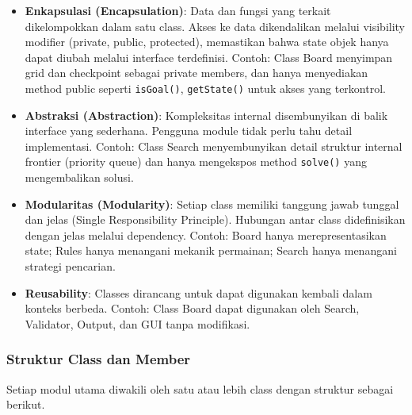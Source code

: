 \begin{itemize}
    \item \textbf{Enkapsulasi (Encapsulation)}: Data dan fungsi yang terkait dikelompokkan dalam satu class. Akses ke data dikendalikan melalui visibility modifier (private, public, protected), memastikan bahwa state objek hanya dapat diubah melalui interface terdefinisi. Contoh: Class Board menyimpan grid dan checkpoint sebagai private members, dan hanya menyediakan method public seperti \texttt{isGoal()}, \texttt{getState()} untuk akses yang terkontrol.

    \item \textbf{Abstraksi (Abstraction)}: Kompleksitas internal disembunyikan di balik interface yang sederhana. Pengguna module tidak perlu tahu detail implementasi. Contoh: Class Search menyembunyikan detail struktur internal frontier (priority queue) dan hanya mengekspos method \texttt{solve()} yang mengembalikan solusi.

    \item \textbf{Modularitas (Modularity)}: Setiap class memiliki tanggung jawab tunggal dan jelas (Single Responsibility Principle). Hubungan antar class didefinisikan dengan jelas melalui dependency. Contoh: Board hanya merepresentasikan state; Rules hanya menangani mekanik permainan; Search hanya menangani strategi pencarian.

    \item \textbf{Reusability}: Classes dirancang untuk dapat digunakan kembali dalam konteks berbeda. Contoh: Class Board dapat digunakan oleh Search, Validator, Output, dan GUI tanpa modifikasi.
\end{itemize}

\subsubsection{Struktur Class dan Member}

Setiap modul utama diwakili oleh satu atau lebih class dengan struktur sebagai berikut.

